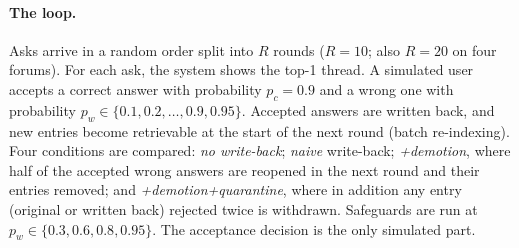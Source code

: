 \documentclass[11pt]{article}
\begin{document}
\paragraph{The loop.} Asks arrive in a random order split into $R$ rounds ($R=10$; also $R=20$ on four forums). For each ask, the system shows the top-1 thread. A simulated user accepts a correct answer with probability $p_c=0.9$ and a wrong one with probability $p_w\in\{0.1,0.2,\dots,0.9,0.95\}$. Accepted answers are written back, and new entries become retrievable at the start of the next round (batch re-indexing). Four conditions are compared: \emph{no write-back}; \emph{naive} write-back; \emph{+demotion}, where half of the accepted wrong answers are reopened in the next round and their entries removed; and \emph{+demotion+quarantine}, where in addition any entry (original or written back) rejected twice is withdrawn. Safeguards are run at $p_w\in\{0.3,0.6,0.8,0.95\}$. The acceptance decision is the only simulated part.
\end{document}
